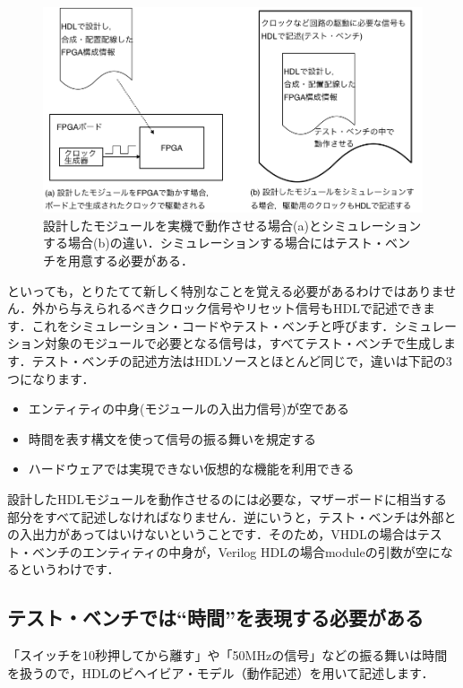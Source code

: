 \documentclass[a4paper,dvipdfmx]{jsarticle}
\begin{document}
 \begin{figure}[H]
  \begin{center}
   \includegraphics[width=.95\textwidth]{chapter04_figures/test_bench_image.png}
  \end{center}
  \caption{設計したモジュールを実機で動作させる場合(a)とシミュレーションする場合(b)の違い．シミュレーションする場合にはテスト・ベンチを用意する必要がある．\label{fig:test_bench_image}}
 \end{figure}

といっても，とりたてて新しく特別なことを覚える必要があるわけではありません．外から与えられるべきクロック信号やリセット信号もHDLで記述できます．これをシミュレーション・コードやテスト・ベンチと呼びます．シミュレーション対象のモジュールで必要となる信号は，すべてテスト・ベンチで生成します．テスト・ベンチの記述方法はHDLソースとほとんど同じで，違いは下記の3つになります．

\begin{itemize}
 \item エンティティの中身(モジュールの入出力信号)が空である 
 \item 時間を表す構文を使って信号の振る舞いを規定する 
 \item ハードウェアでは実現できない仮想的な機能を利用できる 
\end{itemize}

設計したHDLモジュールを動作させるのには必要な，マザーボードに相当する部分をすべて記述しなければなりません．逆にいうと，テスト・ベンチは外部との入出力があってはいけないということです．そのため，VHDLの場合はテスト・ベンチのエンティティの中身が，Verilog HDLの場合moduleの引数が空になるというわけです．

\subsection{テスト・ベンチでは``時間''を表現する必要がある}
「スイッチを10秒押してから離す」や「50MHzの信号」などの振る舞いは時間を扱うので，HDLのビヘイビア・モデル（動作記述）を用いて記述します．
\end{document}
